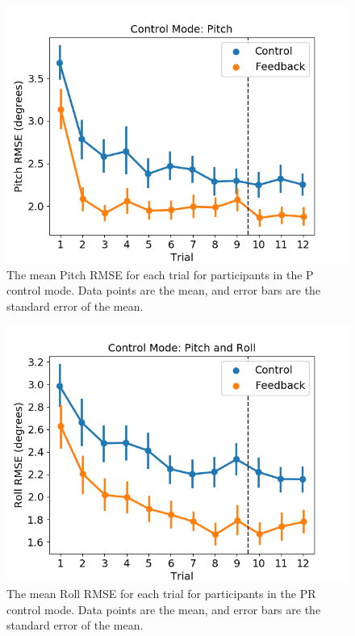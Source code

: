 \begin{figure}[b!]
    \begin{center}
        \includegraphics[width=0.8\linewidth]{figures/image3.png}
        \caption{The mean Pitch RMSE for each trial for participants in the P control mode. Data points are the mean, and error bars are the standard error of the mean.}
    \end{center}
\end{figure}
\begin{figure}[b!]
    \begin{center}
        \includegraphics[width=0.8\linewidth]{figures/image4.png}
        \caption{The mean Roll RMSE for each trial for participants in the PR control mode. Data points are the mean, and error bars are the standard error of the mean.}
    \end{center}
\end{figure}
